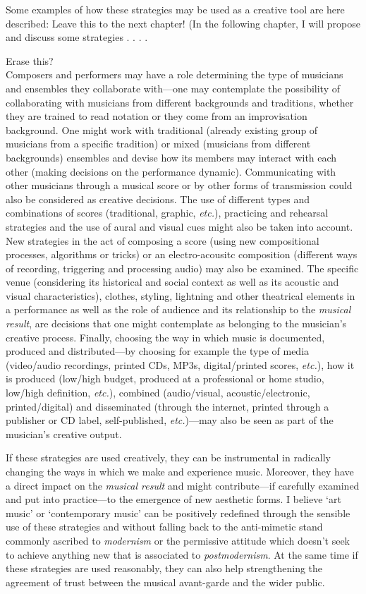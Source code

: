Some examples of how these strategies may be used as a creative tool are here described: Leave this to the next chapter! (In the following chapter, I will propose and discuss some strategies . . . .

Erase this?
\\Composers and performers may have a role determining the type of musicians and ensembles they collaborate with---one may contemplate the possibility of collaborating with musicians from different backgrounds and traditions, whether they are trained to read notation or  they come from an improvisation background. One might work with traditional (already existing group of musicians from a specific tradition) or mixed (musicians from different backgrounds) ensembles and devise how its members may interact with each other (making decisions on the performance dynamic). Communicating with other musicians through a musical score or by other forms of transmission could also be considered as creative decisions. The use of different types and combinations of scores (traditional, graphic, \emph{etc.}), practicing and rehearsal strategies and the use of aural and visual cues might also be taken into account. New strategies in the act of composing a score (using new compositional processes, algorithms or tricks) or an electro-acousitc composition (different ways of recording, triggering and processing audio) may also be examined. The specific venue (considering its historical and social context as well as its acoustic and visual characteristics), clothes, styling, lightning and other theatrical elements in a performance as well as the role of audience and its relationship to the \emph{musical result}, are decisions that one might contemplate as belonging to the musician's creative process. Finally, choosing the way in which music is documented, produced and distributed---by choosing for example the type of media (video/audio recordings, printed CDs, MP3s, digital/printed scores, \emph{etc.}), how it is produced (low/high budget, produced at a professional or home studio, low/high definition, \emph{etc.}), combined (audio/visual, acoustic/electronic, printed/digital) and disseminated (through the internet, printed through a publisher or CD label, self-published, \emph{etc.})---may also be seen as part of the musician's creative output. 

If these strategies are used creatively, they can be instrumental in radically changing the ways in which we make and experience music. Moreover, they have a direct impact on the \emph{musical result} and might contribute---if carefully examined and put into practice---to the emergence of new aesthetic forms. I believe `art music' or `contemporary music' can be positively redefined through the sensible use of these strategies and without falling back to the anti-mimetic stand commonly ascribed to \emph{modernism} or the permissive attitude which doesn't seek to achieve anything new that is associated to \emph{postmodernism}. At the same time if these strategies are used reasonably, they can also help strengthening the agreement of trust between the musical avant-garde and the wider public.

